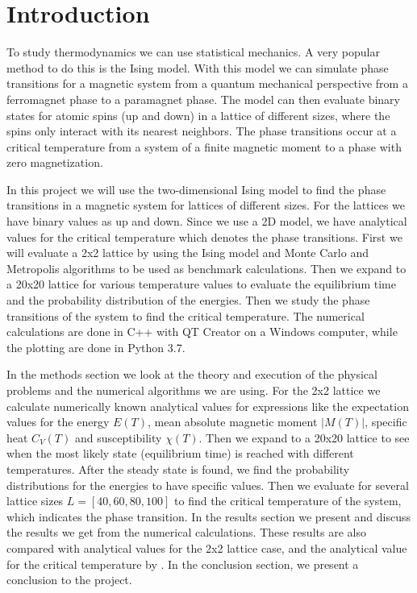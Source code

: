 \documentclass[12pt,a4paper,english]{article}
\begin{document}
\section{Introduction}
\label{sect:Introduction}
To study thermodynamics we can use statistical mechanics. A very popular method to do this is the Ising model. With this model we can simulate phase transitions for a magnetic system from a quantum mechanical perspective from a ferromagnet phase to a paramagnet phase. The model can then evaluate binary states for atomic spins (up and down) in a lattice of different sizes, where the spins only interact with its nearest neighbors. The phase transitions occur at a critical temperature from a system of a finite magnetic moment to a phase with zero magnetization.

In this project we will use the two-dimensional Ising model to find the phase transitions in a magnetic system for lattices of different sizes. For the lattices we have binary values as up and down. Since we use a 2D model, we have analytical values for the critical temperature which denotes the phase transitions. First we will evaluate a 2x2 lattice by using the Ising model and Monte Carlo and Metropolis algorithms to be used as benchmark calculations. Then we expand to a 20x20 lattice for various temperature values to evaluate the equilibrium time and the probability distribution of the energies. Then we study the phase transitions of the system to find the critical temperature. The numerical calculations are done in C++ with QT Creator on a Windows computer, while the plotting are done in Python 3.7.

In the methods section we look at the theory and execution of the physical problems and the numerical algorithms we are using. For the 2x2 lattice we calculate numerically known analytical values for expressions like the expectation values for the energy $E(T)$, mean absolute magnetic moment $|M(T)|$, specific heat $C_V(T)$ and susceptibility $\chi(T)$. Then we expand to a 20x20 lattice to see when the most likely state (equilibrium time) is reached with different temperatures. After the steady state is found, we find the probability distributions for the energies to have specific values. Then we evaluate for several lattice sizes $L=[40,60,80,100]$ to find the critical temperature of the system, which indicates the phase transition. In the results section we present and discuss the results we get from the numerical calculations. These results are also compared with analytical values for the 2x2 lattice case, and the analytical value for the critical temperature by \citet{PhysRev.65.117}. In the conclusion section, we present a conclusion to the project.
\end{document}
